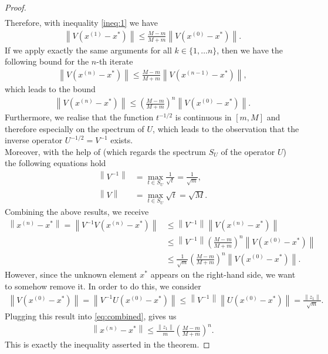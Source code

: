 \begin{proof}
\begin{align*}
\end{align*}
Therefore, with inequality \eqref{ineq:1} we have
\begin{align*}
\left\| V(x^{(1)} - x^{\ast}) \right\|\leq \frac{M-m}{M+m} \left\|V(x^{(0)} - x^{\ast})\right\|.
\end{align*}
If we apply exactly the same arguments for all $k\in\{1,\ldots n\}$, then we have the following bound for the $n$-th iterate
\begin{align*}
\left\| V(x^{(n)} - x^{\ast}) \right\|\leq \frac{M-m}{M+m} \left\|V(x^{(n-1)} - x^{\ast})\right\|,
\end{align*}
which leads to the bound
\begin{align*}
\left\| V(x^{(n)} - x^{\ast}) \right\|\leq \left(\frac{M-m}{M+m}\right)^n \left\|V(x^{(0)} - x^{\ast})\right\|.
\end{align*}
Furthermore, we realise that the function $t^{-1/2}$ is continuous in $[m, M]$ and therefore especially on the spectrum of $U$, which leads to the observation that the inverse operator $U^{-1/2} = V^{-1}$ exists.\\
Moreover, with the help of \cite[Theorem~V.6.2]{kantorovich2016functional} (which regards the spectrum $S_U$ of the operator $U$) the following equations hold
\begin{align*}
\left\|V^{-1}\right\| &= \max_{t\in S_U} \frac{1}{\sqrt{t}} = \frac{1}{\sqrt{m}},\\
\left\|V\right\| &= \max_{t\in S_U} \sqrt{t} = \sqrt{M}.
\end{align*}
Combining the above results, we receive
\begin{align}\label{eq:combined}
\left\| x^{(n)} - x^{\ast} \right\| = \left\| V^{-1}V\left(x^{(n)} - x^{\ast}\right) \right\|&\leq \left\| V^{-1}\right\| \left\|V\left(x^{(n)} - x^{\ast}\right) \right\|\nonumber\\
&\leq \left\| V^{-1}\right\|\left( \frac{M-m}{M+m} \right)^n \left\|V\left(x^{(0)} - x^{\ast}\right) \right\|\nonumber\\
&\leq \frac{1}{\sqrt{m}}\left( \frac{M-m}{M+m} \right)^n \left\|V\left(x^{(0)} - x^{\ast}\right) \right\|.
\end{align}
However, since the unknown element $x^{\ast}$ appears on the right-hand side, we want to somehow remove it. In order to do this, we consider
\begin{align*}
\left\|V(x^{(0)} - x^{\ast}) \right\| = \left\|V^{-1}U(x^{(0)} - x^{\ast}) \right\| \leq \left\|V^{-1}\right\| \left\|U(x^{(0)} - x^{\ast}) \right\| = \frac{\|z_1\|}{\sqrt{m}}.
\end{align*}
Plugging this result into \eqref{eq:combined}, gives us
\begin{align*}
\left\| x^{(n)} - x^{\ast} \right\| \leq \frac{\|z_1\|}{m}\left( \frac{M-m}{M+m} \right)^n.
\end{align*}
This is exactly the inequality asserted in the theorem.
\end{proof}

